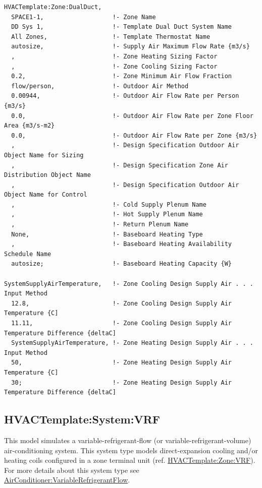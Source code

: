\begin{lstlisting}
HVACTemplate:Zone:DualDuct,
  SPACE1-1,                   !- Zone Name
  DD Sys 1,                   !- Template Dual Duct System Name
  All Zones,                  !- Template Thermostat Name
  autosize,                   !- Supply Air Maximum Flow Rate {m3/s}
  ,                           !- Zone Heating Sizing Factor
  ,                           !- Zone Cooling Sizing Factor
  0.2,                        !- Zone Minimum Air Flow Fraction
  flow/person,                !- Outdoor Air Method
  0.00944,                    !- Outdoor Air Flow Rate per Person {m3/s}
  0.0,                        !- Outdoor Air Flow Rate per Zone Floor Area {m3/s-m2}
  0.0,                        !- Outdoor Air Flow Rate per Zone {m3/s}
  ,                           !- Design Specification Outdoor Air Object Name for Sizing
  ,                           !- Design Specification Zone Air Distribution Object Name
  ,                           !- Design Specification Outdoor Air Object Name for Control
  ,                           !- Cold Supply Plenum Name
  ,                           !- Hot Supply Plenum Name
  ,                           !- Return Plenum Name
  None,                       !- Baseboard Heating Type
  ,                           !- Baseboard Heating Availability Schedule Name
  autosize;                   !- Baseboard Heating Capacity {W}

SystemSupplyAirTemperature,   !- Zone Cooling Design Supply Air . . . Input Method
  12.8,                       !- Zone Cooling Design Supply Air Temperature {C]
  11.11,                      !- Zone Cooling Design Supply Air Temperature Difference {deltaC]
  SystemSupplyAirTemperature, !- Zone Heating Design Supply Air . . . Input Method
  50,                         !- Zone Heating Design Supply Air Temperature {C]
  30;                         !- Zone Heating Design Supply Air Temperature Difference {deltaC]
\end{lstlisting}

\subsection{HVACTemplate:System:VRF}\label{hvactemplatesystemvrf}

This model simulates a variable-refrigerant-flow (or variable-refrigerant-volume) air-conditioning system. This system type models direct-expansion cooling and/or heating coils configured in a zone terminal unit (ref. \hyperref[hvactemplatezonevrf]{HVACTemplate:Zone:VRF}). For more details about this system type see \hyperref[airconditionervariablerefrigerantflow]{AirConditioner:VariableRefrigerantFlow}.

